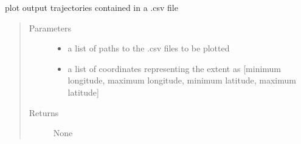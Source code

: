 \documentclass[letterpaper,10pt,english]{sphinxmanual}
\begin{document}
\begin{fulllineitems}
\label{\detokenize{octapy:octapy.tools.plot_csv_output}}
\sphinxAtStartPar
plot output trajectories contained in a .csv file
\begin{quote}\begin{description}
\item[{Parameters}] \leavevmode\begin{itemize}
\item {} 
\sphinxAtStartPar
{} \textendash{} a list of paths to the .csv files to be plotted

\item {} 
\sphinxAtStartPar
{} \textendash{} a list of coordinates representing the extent as {[}minimum longitude,
maximum longitude, minimum latitude, maximum latitude{]}

\end{itemize}

\item[{Returns}] \leavevmode
\sphinxAtStartPar
None

\end{description}\end{quote}

\end{fulllineitems}

\end{document}
